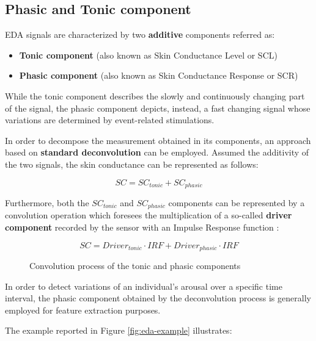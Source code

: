 \subsection{Phasic and Tonic component}\label{subsec:phasic-tonic}

EDA signals are characterized by two \textbf{additive} components \cite{eda-guide} referred as:

\begin{itemize}
    \item \textbf{Tonic component} (also known as Skin Conductance Level or SCL)
    \item \textbf{Phasic component} (also known as Skin Conductance Response or SCR)
\end{itemize}

While the tonic component describes the slowly and continuously changing part of the signal, the phasic component depicts, instead, a fast changing signal whose variations are determined by event-related stimulations.

In order to decompose the measurement obtained in its components, an approach based on \textbf{standard deconvolution} can be employed. Assumed the additivity of the two signals, the skin conductance can be represented as follows:

\begin{equation}
    SC = SC_{tonic} + SC_{phasic}
\end{equation}

Furthermore, both the $SC_{tonic}$ and $SC_{phasic}$ components can be represented by a convolution operation which foresees the multiplication of a so-called \textbf{driver component} recorded by the sensor with an Impulse Response function \cite{edasvm}:

\vspace{5mm}

\begin{figure}[H]
\begin{equation}
SC = Driver_{tonic} \cdot IRF + Driver_{phasic} \cdot IRF
\end{equation}
\caption{Convolution process of the tonic and phasic components}
\label{fig:eda-convolution}
\end{figure}

In order to detect variations of an individual's arousal over a specific time interval, the phasic component obtained by the deconvolution process is generally employed for feature extraction purposes.

The example reported in Figure \ref{fig:eda-example} illustrates:

